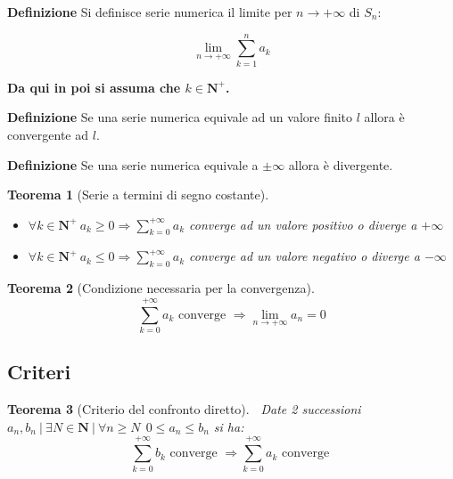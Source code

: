 \documentclass{article}
\newtheorem{theorem}{Teorema}
\begin{document}
\noindent\textbf{Definizione} Si definisce serie numerica il limite per $n\rightarrow+\infty$ di $S_n$:

$$\lim_{n\rightarrow+\infty}\sum_{k=1}^{n}a_k$$\newline

\noindent \textbf{Da qui in poi si assuma che $k\in\mathbf{N^+}$.}\newline

\noindent\textbf{Definizione} Se una serie numerica equivale ad un valore finito $l$ allora è convergente ad $l$.\newline

\noindent\textbf{Definizione} Se una serie numerica equivale a $\pm\infty$ allora è divergente.\newline

\begin{theorem}[Serie a termini di segno costante]
    $\ $\newline
    \begin{itemize}
        \item $\forall k\in\mathbf{N^+}\ a_k\geq0\Rightarrow \sum_{k=0}^{+\infty}a_k$ converge ad un valore positivo o diverge a $+\infty$

        \item $\forall k\in\mathbf{N^+}\ a_k\leq0\Rightarrow \sum_{k=0}^{+\infty}a_k$ converge ad un valore negativo o diverge a $-\infty$\newline
        
    \end{itemize}
\end{theorem}

\begin{theorem}[Condizione necessaria per la convergenza]$\ $\newline
    $$\sum_{k=0}^{+\infty}a_k \text{ converge }\Rightarrow \lim_{n\rightarrow+\infty}a_n=0$$\newline
\end{theorem}

\subsection{Criteri}

\begin{theorem}[Criterio del confronto diretto]$\ $\newline
    Date 2 successioni $a_n,b_n\ |\ \exists N\in\mathbf{N}\ |\ \forall n\geq N\ \ 0\leq a_n\leq b_n$ si ha:
    $$\sum_{k=0}^{+\infty}b_k \text{ converge }\Rightarrow\sum_{k=0}^{+\infty}a_k\text{ converge }$$
\end{theorem}
\end{document}

